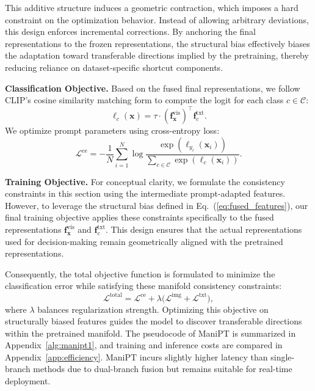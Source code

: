 \documentclass{article}
\theoremstyle{plain}
\theoremstyle{definition}
\theoremstyle{remark}
\begin{document}
	This additive structure induces a geometric contraction, which imposes a hard constraint on the optimization behavior. Instead of allowing arbitrary deviations, this design enforces incremental corrections. By anchoring the final representations to the frozen representations, the structural bias effectively biases the adaptation toward transferable directions implied by the pretraining, thereby reducing reliance on dataset-specific shortcut components.
	
	\textbf{Classification Objective.}
	Based on the fused final representations, we follow CLIP's cosine similarity matching form to compute the logit for each class $c\in \mathcal{C}$:
	\begin{equation}
		\ell_c(\mathbf{x})=\tau \cdot \left(\mathbf{f}^{\mathrm{vis}}_{\mathbf{x}}\right)^{\top} \mathbf{f}^{\mathrm{txt}}_{c}.
	\end{equation}
	We optimize prompt parameters using cross-entropy loss:
	\begin{equation}
		\mathcal{L}^{\mathrm{ce}}
		=
		-\frac{1}{N}\sum_{i=1}^{N}\log
		\frac{\exp(\ell_{y_i}(\mathbf{x}_i))}
		{\sum_{c\in \mathcal{C}}\exp(\ell_c(\mathbf{x}_i))}.
	\end{equation}
	
	\textbf{Training Objective.} For conceptual clarity, we formulate the consistency constraints in this section using the intermediate prompt-adapted features. However, to leverage the structural bias defined in Eq.~(\ref{eq:fused_features}), our final training objective applies these constraints specifically to the fused representations $\mathbf{f}^{\mathrm{vis}}_{\mathbf{x}}$ and $\mathbf{f}^{\mathrm{txt}}_{c}$. This design ensures that the actual representations used for decision-making remain geometrically aligned with the pretrained representations.
	
	Consequently, the total objective function is formulated to minimize the classification error while satisfying these manifold consistency constraints:
	\begin{equation}
		\label{eq:total_loss}
		\mathcal{L}^{\mathrm{total}} = \mathcal{L}^{\mathrm{ce}} + \lambda \bigl(\mathcal{L}^{\mathrm{img}} + \mathcal{L}^{\mathrm{txt}}\bigr),
	\end{equation}
	where $\lambda$ balances regularization strength. Optimizing this objective on structurally biased features guides the model to discover transferable directions within the pretrained manifold. The pseudocode of ManiPT is summarized in Appendix~\ref{alg:manipt1}, and training and inference costs are compared in Appendix~\ref{app:efficiency}. ManiPT incurs slightly higher latency than single-branch methods due to dual-branch fusion but remains suitable for real-time deployment.
	
\end{document}
